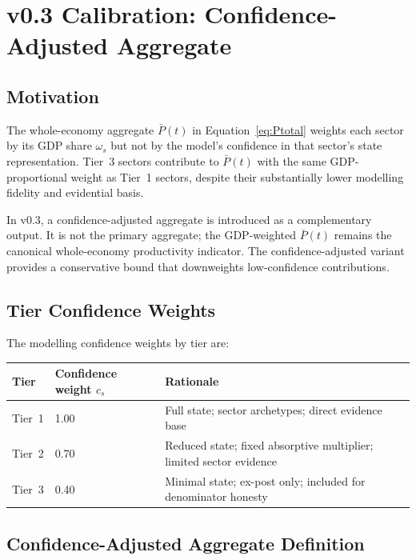 \documentclass[11pt,a4paper]{article}
\begin{document}
\section{v0.3 Calibration: Confidence-Adjusted Aggregate}
\label{sec:cal_agg}

\subsection{Motivation}

The whole-economy aggregate $\bar{P}(t)$ in Equation~\eqref{eq:Ptotal} weights each sector by its GDP share $\omega_s$ but not by the model's confidence in that sector's state representation. Tier~3 sectors contribute to $\bar{P}(t)$ with the same GDP-proportional weight as Tier~1 sectors, despite their substantially lower modelling fidelity and evidential basis.

In v0.3, a confidence-adjusted aggregate is introduced as a complementary output. It is not the primary aggregate; the GDP-weighted $\bar{P}(t)$ remains the canonical whole-economy productivity indicator. The confidence-adjusted variant provides a conservative bound that downweights low-confidence contributions.

\subsection{Tier Confidence Weights}

The modelling confidence weights by tier are:

\begin{center}
\begin{tabular}{lll}
\toprule
Tier & Confidence weight $c_s$ & Rationale \\
\midrule
Tier~1 & 1.00 & Full state; sector archetypes; direct evidence base \\
Tier~2 & 0.70 & Reduced state; fixed absorptive multiplier; limited sector evidence \\
Tier~3 & 0.40 & Minimal state; ex-post only; included for denominator honesty \\
\bottomrule
\end{tabular}
\end{center}

\subsection{Confidence-Adjusted Aggregate Definition}
\end{document}
